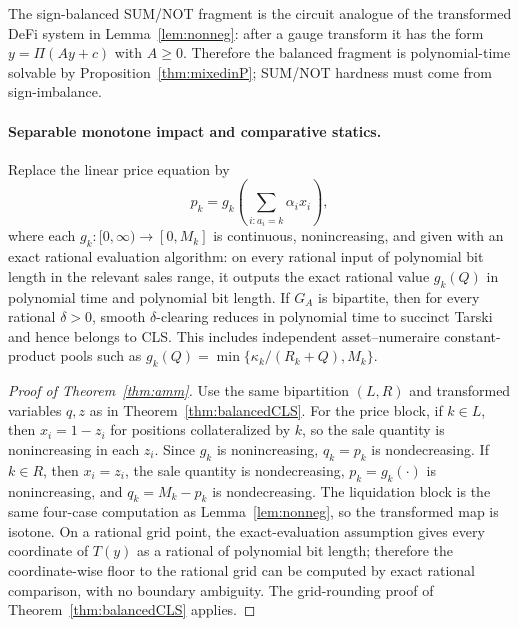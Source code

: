 \documentclass{llncs}
\newcommand{\clip}{\Pi}
\newcommand{\GA}{G_A}
\begin{document}
\begin{corollary}
\label{cor:fragment}
The sign-balanced SUM/NOT fragment is the circuit analogue of the transformed DeFi system in Lemma~\ref{lem:nonneg}: after a gauge transform it has the form \(y=\clip(Ay+c)\) with \(A\ge0\). Therefore the balanced fragment is polynomial-time solvable by Proposition~\ref{thm:mixedinP}; SUM/NOT hardness must come from sign-imbalance.
\end{corollary}

\paragraph{Separable monotone impact and comparative statics.}
\begin{theorem}
\label{thm:amm}
Replace the linear price equation by
\[
        p_k=g_k\!\left(\sum_{i:a_i=k}\alpha_i x_i\right),
\]
where each \(g_k:[0,\infty)\to[0,M_k]\) is continuous, nonincreasing, and given with an exact rational evaluation algorithm: on every rational input of polynomial bit length in the relevant sales range, it outputs the exact rational value \(g_k(Q)\) in polynomial time and polynomial bit length. If \(\GA\) is bipartite, then for every rational \(\delta>0\), smooth \(\delta\)-clearing reduces in polynomial time to succinct Tarski and hence belongs to CLS. This includes independent asset--numeraire constant-product pools such as \(g_k(Q)=\min\{\kappa_k/(R_k+Q),M_k\}\).
\end{theorem}

\begin{proof}[Proof of Theorem~\ref{thm:amm}]
Use the same bipartition \((L,R)\) and transformed variables \(q,z\) as in Theorem~\ref{thm:balancedCLS}. For the price block, if \(k\in L\), then \(x_i=1-z_i\) for positions collateralized by \(k\), so the sale quantity is nonincreasing in each \(z_i\). Since \(g_k\) is nonincreasing, \(q_k=p_k\) is nondecreasing. If \(k\in R\), then \(x_i=z_i\), the sale quantity is nondecreasing, \(p_k=g_k(\cdot)\) is nonincreasing, and \(q_k=M_k-p_k\) is nondecreasing. The liquidation block is the same four-case computation as Lemma~\ref{lem:nonneg}, so the transformed map is isotone. On a rational grid point, the exact-evaluation assumption gives every coordinate of \(T(y)\) as a rational of polynomial bit length; therefore the coordinate-wise floor to the rational grid can be computed by exact rational comparison, with no boundary ambiguity. The grid-rounding proof of Theorem~\ref{thm:balancedCLS} applies.
\end{proof}
\end{document}
